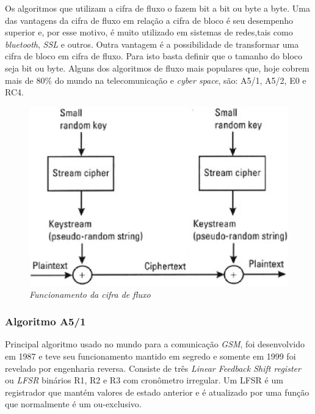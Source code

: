 Os algoritmos que utilizam a cifra de fluxo o fazem bit a bit ou byte a byte. Uma das vantagens da cifra de fluxo em relação a cifra de bloco é seu desempenho superior e, por esse motivo, é muito utilizado em sistemas de redes,tais como \textit{bluetooth}, \textit{SSL} e outros. Outra vantagem é a possibilidade de transformar uma cifra de bloco em cifra de fluxo. Para isto basta definir que o tamanho do bloco seja bit ou byte. Alguns dos algoritmos de fluxo mais populares que, hoje cobrem mais de 80$\%$ do mundo na telecomunicação e \textit{cyber space}, são: A5/1, A5/2, E0 e RC4. ~\cite{majid-mohd}
\begin{figure}[h]
\centering
\includegraphics[keepaspectratio=true,scale=0.7]
    {figuras/stream_cipher.eps}
    \caption[\textit{Funcionamento da cifra de fluxo }]{\textit{Funcionamento da cifra de fluxo }\protect\footnotemark} 
\end{figure}

\subsubsection{Algoritmo A5/1}
\label{algorithm-a51}

Principal algoritmo usado no mundo para a comunicação \textit{GSM}, foi desenvolvido em 1987 e teve seu funcionamento mantido em segredo e somente em 1999 foi revelado por engenharia reversa. Consiste de três \textit{Linear Feedback Shift register} ou \textit{LFSR} binários R1, R2 e R3 com cronômetro irregular. Um LFSR é um registrador que mantém valores de estado anterior e é atualizado por uma função que normalmente é um ou-exclusivo. 

